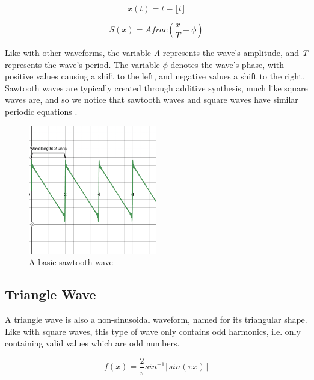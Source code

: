 \begin{equation}
	x(t) = t - \lfloor t \rfloor
	\label{eq:sawtooth-piecewise-function}
\end{equation}

\begin{equation}
	S(x) = Afrac(\frac{x}{T} + \phi)
	\label{eq:sawtooth-sinusoidal-function}
\end{equation}

Like with other waveforms, the variable \textit{A} represents the wave's amplitude, and \textit{T} represents the wave's period. The variable $\phi$ denotes the wave's phase, with positive values causing a shift to the left, and negative values a shift to the right. Sawtooth waves are typically created through additive synthesis, much like square waves are, and so we notice that sawtooth waves and square waves have similar periodic equations \cite{Tarr_2019}.

\begin{figure}
  \centering
  \includegraphics[width=0.5\textwidth]{figures/sawtooth-wave.png}
  \caption{A basic sawtooth wave}
  \label{fig:basic-sawtooth-wave}
\end{figure}


\subsection{Triangle Wave}

A triangle wave is also a non-sinusoidal waveform, named for its triangular shape. Like with square waves, this type of wave only contains odd harmonics, i.e. only containing valid values which are odd numbers.

\begin{equation}
	f(x) = \frac{2}{\pi}sin^{-1}\lceil sin(\pi x) \rceil
	\label{eq:triangle-wave-function}	
\end{equation}


